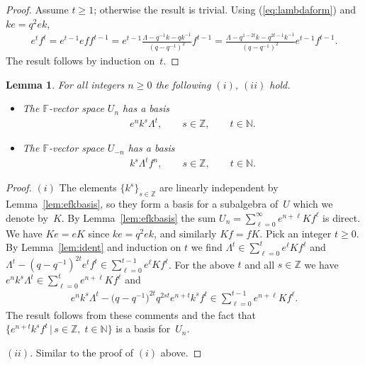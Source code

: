 \documentclass[pdftex]{sigma}
\numberwithin{equation}{section}
\newtheorem{Lemma}[Theorem]{Lemma}
\begin{document}
\begin{proof}
Assume $t\geq 1$; otherwise the result is trivial.
Using
(\ref{eq:lambdaform}) and $ke=q^2ek$,
\begin{gather*}
e^t f^t  =  e^{t-1} ef f^{t-1}
= e^{t-1} \frac{\Lambda -q^{-1}k-qk^{-1}}{(q-q^{-1})^2}f^{t-1}
 = \frac{\Lambda -q^{1-2t}k-q^{2t-1}k^{-1}}{(q-q^{-1})^2}e^{t-1}f^{t-1}.
\end{gather*}
The result follows by induction on~$t$.
\end{proof}



\begin{Lemma}
\label{lem:basisalt}
For all integers $n\geq 0$ the following $(i)$, $(ii)$ hold.
\begin{itemize}\itemsep=0pt
\item[$(i)$]
The $\mathbb F$-vector space $U_n$ has a basis
\begin{gather*}
e^n k^s \Lambda^t,
 \qquad s\in \mathbb Z, \qquad   t\in \mathbb N.
\end{gather*}
\item[$(ii)$]
The $\mathbb F$-vector space $U_{-n}$ has a basis
\begin{gather*}
k^s \Lambda^t  f^n,
 \qquad s\in \mathbb Z, \qquad   t\in \mathbb N.
\end{gather*}
\end{itemize}
\end{Lemma}

\begin{proof}
$(i)$ The elements
$\lbrace k^s\rbrace_{s \in \mathbb Z}$ are linearly
independent
by
Lemma~\ref{lem:efkbasis}, so they form
a basis for a subalgebra of~$U$ which we denote by~$K$.
By Lemma~\ref{lem:efkbasis}
the sum $U_n=\sum\limits_{\ell=0}^\infty e^{n+\ell} K f^\ell$ is direct.
We have
$Ke=eK$ since
$ke=q^2ek$, and
similarly $Kf=fK$.
Pick an integer $t\geq 0$.
By Lemma~\ref{lem:ident}  and induction on $t$
we f\/ind
$ \Lambda^t \in
\sum\limits_{\ell=0}^t e^\ell Kf^\ell$
and
$\Lambda^t -(q-q^{-1})^{2t} e^t f^t
\in
\sum\limits_{\ell=0}^{t-1} e^{\ell} K f^\ell $.
For the above $t$ and all $s\in \mathbb Z$
we have $e^n k^s \Lambda^t  \in
\sum\limits_{\ell=0}^t e^{n+\ell} K f^\ell $ and
\begin{gather*}
e^n k^s \Lambda^t - \big(q-q^{-1}\big)^{2t} q^{2st}e^{n+t}k^s f^t \in
\sum_{\ell=0}^{t-1} e^{n+\ell} K f^\ell.
\end{gather*}
The result follows
from these comments
and the fact that
$\lbrace
e^{n+t}k^s f^t \,|\, s\in \mathbb Z,\;t\in \mathbb N\rbrace$ is a basis for~$U_n$.

$(ii)$. Similar to the proof of $(i)$ above.
\end{proof}
\end{document}
